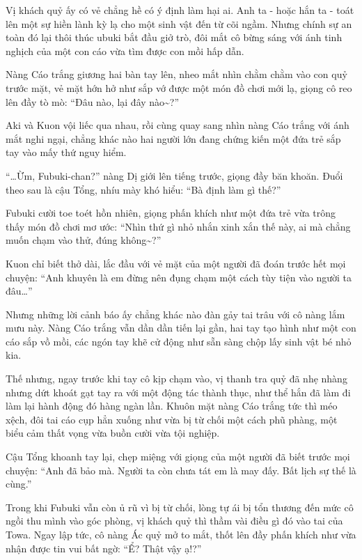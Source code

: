 \documentclass[../main.tex]{subfiles}
\begin{document}
\ct

Vị khách quỷ ấy có vẻ chẳng hề có ý định làm hại ai. Anh ta - hoặc hắn ta - toát lên một sự hiền lành kỳ lạ cho một sinh vật đến từ cõi ngầm. Nhưng chính sự an toàn đó lại thôi thúc ubuki bắt đầu giở trò, đôi mắt cô bừng sáng với ánh tinh nghịch của một con cáo vừa tìm được con mồi hấp dẫn.

Nàng Cáo trắng giương hai bàn tay lên, nheo mắt nhìn chằm chằm vào con quỷ trước mặt, vẻ mặt hớn hở như sắp vớ được một món đồ chơi mới lạ, giọng cô reo lên đầy tò mò: ``Đâu nào, lại đây nào\~{}?''

Aki và Kuon vội liếc qua nhau, rồi cùng quay sang nhìn nàng Cáo trắng với ánh mắt nghi ngại, chẳng khác nào hai người lớn đang chứng kiến một đứa trẻ sắp tay vào mấy thứ nguy hiểm.

``\dots Ừm, Fubuki-chan?'' nàng Dị giới lên tiếng trước, giọng đầy băn khoăn. Đuổi theo sau là cậu Tổng, nhíu mày khó hiểu: ``Bà định làm gì thế?''

Fubuki cười toe toét hồn nhiên, giọng phấn khích như một đứa trẻ vừa trông thấy món đồ chơi mơ ước: ``Nhìn thứ gì nhỏ nhắn xinh xắn thế này, ai mà chẳng muốn chạm vào thử, đúng không\~{}?''

Kuon chỉ biết thở dài, lắc đầu với vẻ mặt của một người đã đoán trước hết mọi chuyện: ``Anh khuyên là em đừng nên đụng chạm một cách tùy tiện vào người ta đâu\dots''

Nhưng những lời cảnh báo ấy chẳng khác nào đàn gảy tai trâu với cô nàng lắm mưu này. Nàng Cáo trắng vẫn dần dần tiến lại gần, hai tay tạo hình như một con cáo sắp vồ mồi, các ngón tay khẽ cử động như sẵn sàng chộp lấy sinh vật bé nhỏ kia.

Thế nhưng, ngay trước khi tay cô kịp chạm vào, vị thanh tra quỷ đã nhẹ nhàng nhưng dứt khoát gạt tay ra với một động tác thành thục, như thể hắn đã làm đi làm lại hành động đó hàng ngàn lần. Khuôn mặt nàng Cáo trắng tức thì méo xệch, đôi tai cáo cụp hẳn xuống như vừa bị từ chối một cách phũ phàng, một biểu cảm thất vọng vừa buồn cười vừa tội nghiệp.


Cậu Tổng khoanh tay lại, chẹp miệng với giọng của một người đã biết trước mọi chuyện: ``Anh đã bảo mà. Người ta còn chưa tát em là may đấy. Bất lịch sự thế là cùng.''

Trong khi Fubuki vẫn còn ủ rũ vì bị từ chối, lòng tự ái bị tổn thương đến mức cô ngồi thu mình vào góc phòng, vị khách quỷ thì thầm vài điều gì đó vào tai của Towa. Ngay lập tức, cô nàng Ác quỷ mở to mắt, thốt lên đầy phấn khích như vừa nhận được tin vui bất ngờ: ``Ể? Thật vậy ạ!?''
\end{document}

